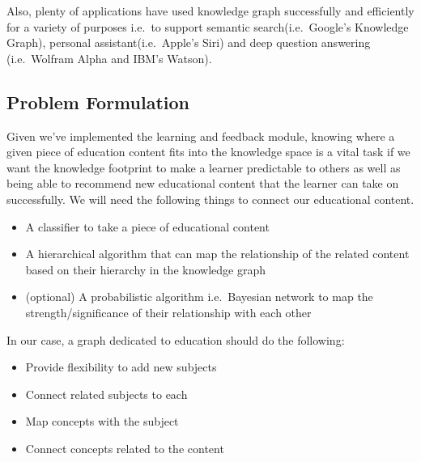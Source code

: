 \documentclass[]{book}
\theoremstyle{definition}
\theoremstyle{definition}
\theoremstyle{definition}
\theoremstyle{remark}
\begin{document}
Also, plenty of applications have used knowledge graph successfully and
efficiently for a variety of purposes i.e.~to support semantic
search(i.e.~Google's Knowledge Graph), personal assistant(i.e.~Apple's
Siri) and deep question answering (i.e.~Wolfram Alpha and IBM's Watson).

\subsection{Problem Formulation}\label{problem-formulation-2}

Given we've implemented the learning and feedback module, knowing where
a given piece of education content fits into the knowledge space is a
vital task if we want the knowledge footprint to make a learner
predictable to others as well as being able to recommend new educational
content that the learner can take on successfully. We will need the
following things to connect our educational content.

\begin{itemize}
\item
  A classifier to take a piece of educational content
\item
  A hierarchical algorithm that can map the relationship of the related
  content based on their hierarchy in the knowledge graph
\item
  (optional) A probabilistic algorithm i.e.~Bayesian network to map the
  strength/significance of their relationship with each other
\end{itemize}

In our case, a graph dedicated to education should do the following:

\begin{itemize}
\item
  Provide flexibility to add new subjects
\item
  Connect related subjects to each
\item
  Map concepts with the subject
\item
  Connect concepts related to the content
\end{itemize}
\end{document}
